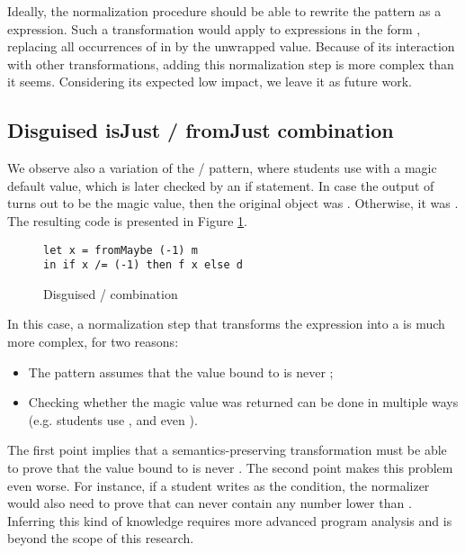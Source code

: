 Ideally, the normalization procedure should be able to rewrite the  pattern as a  expression. Such a transformation would apply to expressions in the form , replacing all occurrences of  in  by the unwrapped value. Because of its interaction with other transformations, adding this normalization step is more complex than it seems. Considering its expected low impact, we leave it as future work.

\subsection{Disguised isJust / fromJust combination}

We observe also a variation of the  /  pattern, where students use  with a magic default value, which is later checked by an if statement. In case the output of  turns out to be the magic value, then the original  object was . Otherwise, it was . The resulting code is presented in Figure \ref{fig:maybe-isjust-fromjust-disguised}.

\begin{figure}
\centering
\begin{verbatim}
let x = fromMaybe (-1) m
in if x /= (-1) then f x else d
\end{verbatim}
\caption{Disguised  /  combination}
\label{fig:maybe-isjust-fromjust-disguised}
\end{figure}

In this case, a normalization step that transforms the expression into a  is much more complex, for two reasons:

\begin{itemize}
    \item The pattern assumes that the value bound to  is never ;
    \item Checking whether the magic value was returned can be done in multiple ways (e.g. students use \haskell{(==)}, \haskell{(/=)} and even \haskell{(>)}).
\end{itemize}

The first point implies that a semantics-preserving transformation must be able to prove that the value bound to  is never . The second point makes this problem even worse. For instance, if a student writes  as the  condition, the normalizer would also need to prove that  can never contain any number lower than . Inferring this kind of knowledge requires more advanced program analysis and is beyond the scope of this research.

